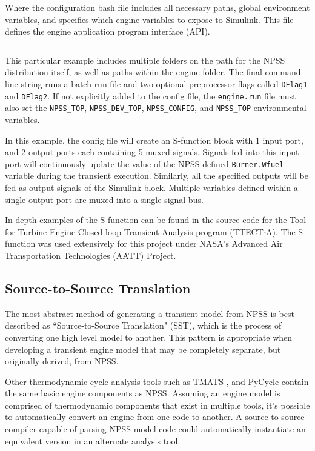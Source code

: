 \documentclass[heading.tex]{subfiles}
\begin{document}
Where the configuration bash file includes all necessary paths, global environment variables, and specifies
which engine variables to expose to Simulink. This file defines the engine application program interface (API).

 \begin{adjustwidth}{-1cm}{-1cm}
 \inputminted[]{bash}{code/engineConfig.bat}
 \end{adjustwidth} 

This particular example includes multiple folders on the path for the NPSS distribution itself,
as well as paths within the engine folder.
The final command line string runs a batch run file and two optional preprocessor flags called \texttt{DFlag1}
and \texttt{DFlag2}. If not explicitly added to the config file, the \texttt{engine.run} file must also set
the \texttt{NPSS\_TOP}, \texttt{NPSS\_DEV\_TOP}, \texttt{NPSS\_CONFIG}, and \texttt{NPSS\_TOP} environmental variables.

In this example, the config file will create an S-function block with 1 input port,
and 2 output ports each containing 5 muxed signals.
Signals fed into this input port will continuously update the value of the NPSS defined \texttt{Burner.Wfuel}
variable during the transient execution. Similarly, all the specified outputs will be fed as output
signals of the Simulink block.
Multiple variables defined within a single output port are muxed into a single signal bus.


In-depth examples of the S-function can be found in the source code for the
Tool for Turbine Engine Closed-loop Transient Analysis program (TTECTrA). \cite{TTECTrA}
The S-function was used extensively for this project under
NASA's Advanced Air Transportation Technologies (AATT) Project.

\subsection{Source-to-Source Translation}

The most abstract method of generating a transient model from NPSS is best described as ``Source-to-Source Translation"
(SST), which is the process of converting one high level model to another. This pattern is appropriate when developing
a transient engine model that may be completely separate, but originally derived, from NPSS.

Other thermodynamic cycle analysis tools such as TMATS \cite{TMATS} \cite{TMATS-NPSS}, and PyCycle
contain the same basic engine components as NPSS.
Assuming an engine model is comprised of thermodynamic components that exist in multiple tools,
it's possible to automatically convert an engine from one code to another.
A source-to-source compiler capable of parsing NPSS model code could automatically
instantiate an equivalent version in an alternate analysis tool.
\end{document}
